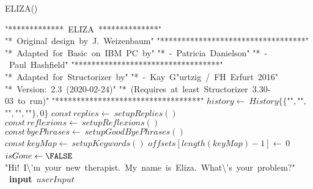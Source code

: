 \documentclass[a4paper,10pt]{article}
\begin{document}
\begin{algorithm}
\caption{ELIZA()}
\begin{algorithmic}[5]

\STATE {}
\STATE {}
\STATE {}
\STATE {}
\STATE {}
\STATE {}
\STATE {}
\STATE {}
\STATE {}
\STATE {}
\STATE {}
  \PRINT\(\)"{}*************\ ELIZA\ **************"{}\(\)
  \PRINT\(\)"{}*\ Original\ design\ by\ J.\ Weizenbaum"{}\(\)
  \PRINT\(\)"{}**********************************"{}\(\)
  \PRINT\(\)"{}*\ Adapted\ for\ Basic\ on\ IBM\ PC\ by"{}\(\)
  \PRINT\(\)"{}*\ -\ Patricia\ Danielson"{}\(\)
  \PRINT\(\)"{}*\ -\ Paul\ Hashfield"{}\(\)
  \PRINT\(\)"{}**********************************"{}\(\)
  \PRINT\(\)"{}*\ Adapted\ for\ Structorizer\ by"{}\(\)
  \PRINT\(\)"{}*\ -\ Kay\ G"urtzig\ /\ FH\ Erfurt\ 2016"{}\(\)
  \PRINT\(\)"{}*\ Version:\ 2.3\ (2020-02-24)"{}\(\)
  \PRINT\(\)"{}*\ (Requires\ at\ least\ Structorizer\ 3.30-03\ to\ run)"{}\(\)
  \PRINT\(\)"{}**********************************"{}\(\)
  \STATE {}
  \STATE {}
  \STATE \(history\gets\ History\{\{\)"{}"{}\(,\)"{}"{}\(,\)"{}"{}\(,\)"{}"{}\(,\)"{}"{}\(\},0\}\)
  \STATE \(const\ replies\gets\ setupReplies()\)
  \STATE \(const\ reflexions\gets\ setupReflexions()\)
  \STATE \(const\ byePhrases\gets\ setupGoodByePhrases()\)
  \STATE \(const\ keyMap\gets\ setupKeywords()\)
  \STATE \(offsets[length(keyMap)-1]\gets\ 0\)
  \STATE \(isGone\gets\FALSE\)
  \PRINT\(\)"{}Hi!\ I\textbackslash{}'{}m\ your\ new\ therapist.\ My\ name\ is\ Eliza.\ What\textbackslash{}'{}s\ your\ problem?"{}\(\)
  \REPEAT
    \STATE\ \textbf{input}\ \(userInput\)
    \STATE {}

\end{algorithmic}
\end{algorithm}
\end{document}
